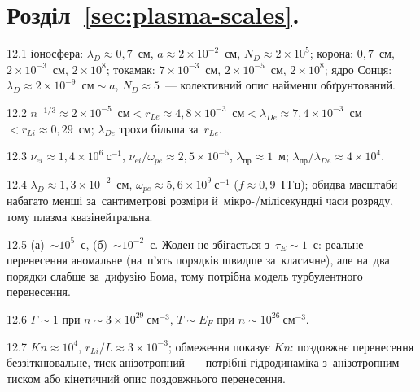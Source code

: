 \protect \section *{Розділ~\ref *{sec:plasma-scales}. }
\begin{Solution}{12.{1}}
		іоносфера: $\lambda_D\approx0{,}7$~см, $a\approx2\times10^{-2}$~см, $N_D\approx2\times10^{5}$;
корона: $0{,}7$~см, $2\times10^{-3}$~см, $2\times10^{8}$; токамак: $7\times10^{-3}$~см, $2\times10^{-5}$~см, $2\times10^{8}$;
ядро Сонця: $\lambda_D\approx2\times10^{-9}$~см${}\sim a$, $N_D\approx5$~--- колективний опис найменш обґрунтований.
	
\end{Solution}
\begin{Solution}{12.{2}}
		$n^{-1/3}\approx2\times10^{-5}$~см${}<r_{Le}\approx4{,}8\times10^{-3}$~см${}<\lambda_{De}\approx7{,}4\times10^{-3}$~см${}<r_{Li}\approx0{,}29$~см;
$\lambda_{De}$ трохи більша за~$r_{Le}$.
	
\end{Solution}
\begin{Solution}{12.{3}}
		$\nu_{ei}\approx1{,}4\times10^{6}~\mathrm{с}^{-1}$, $\nu_{ei}/\omega_{pe}\approx2{,}5\times10^{-5}$,
$\lambda_{\mathrm{пр}}\approx1$~м; $\lambda_{\mathrm{пр}}/\lambda_{De}\approx4\times10^{4}$.
	
\end{Solution}
\begin{Solution}{12.{4}}
		$\lambda_D\approx1{,}3\times10^{-2}$~см, $\omega_{pe}\approx5{,}6\times10^{9}~\mathrm{с}^{-1}$ ($f\approx0{,}9$~ГГц);
обидва масштаби набагато менші за~сантиметрові розміри й~мікро-/мілісекундні часи розряду, тому плазма квазінейтральна.
	
\end{Solution}
\begin{Solution}{12.{5}}
		(а)~$\sim10^{5}$~с, (б)~$\sim10^{-2}$~с. Жоден не збігається з~$\tau_E\sim1$~с: реальне перенесення аномальне
(на~п'ять порядків швидше за~класичне), але на~два порядки слабше за~дифузію Бома, тому потрібна модель турбулентного перенесення.
	
\end{Solution}
\begin{Solution}{12.{6}}
		$\Gamma\sim1$ при $n\sim3\times10^{29}~\mathrm{см}^{-3}$, $T\sim E_F$ при $n\sim10^{26}~\mathrm{см}^{-3}$.
	
\end{Solution}
\begin{Solution}{12.{7}}
		$Kn\approx10^{4}$, $r_{Li}/L\approx3\times10^{-3}$; обмеження показує $Kn$: поздовжнє перенесення
беззіткнювальне, тиск анізотропний~--- потрібні гідродинаміка з~анізотропним тиском або кінетичний опис поздовжнього перенесення.
	
\end{Solution}
